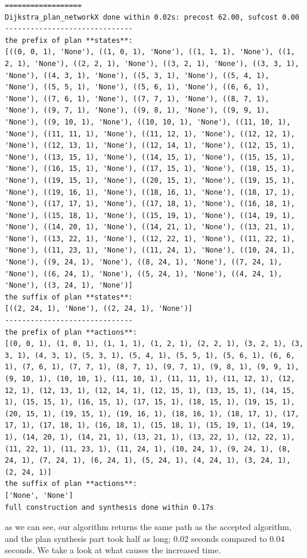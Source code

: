 \begin{lstlisting}
==================
Dijkstra_plan_networkX done within 0.02s: precost 62.00, sufcost 0.00
------------------------------
the prefix of plan **states**:
[((0, 0, 1), 'None'), ((1, 0, 1), 'None'), ((1, 1, 1), 'None'), ((1, 2, 1), 'None'), ((2, 2, 1), 'None'), ((3, 2, 1), 'None'), ((3, 3, 1), 'None'), ((4, 3, 1), 'None'), ((5, 3, 1), 'None'), ((5, 4, 1), 'None'), ((5, 5, 1), 'None'), ((5, 6, 1), 'None'), ((6, 6, 1), 'None'), ((7, 6, 1), 'None'), ((7, 7, 1), 'None'), ((8, 7, 1), 'None'), ((9, 7, 1), 'None'), ((9, 8, 1), 'None'), ((9, 9, 1), 'None'), ((9, 10, 1), 'None'), ((10, 10, 1), 'None'), ((11, 10, 1), 'None'), ((11, 11, 1), 'None'), ((11, 12, 1), 'None'), ((12, 12, 1), 'None'), ((12, 13, 1), 'None'), ((12, 14, 1), 'None'), ((12, 15, 1), 'None'), ((13, 15, 1), 'None'), ((14, 15, 1), 'None'), ((15, 15, 1), 'None'), ((16, 15, 1), 'None'), ((17, 15, 1), 'None'), ((18, 15, 1), 'None'), ((19, 15, 1), 'None'), ((20, 15, 1), 'None'), ((19, 15, 1), 'None'), ((19, 16, 1), 'None'), ((18, 16, 1), 'None'), ((18, 17, 1), 'None'), ((17, 17, 1), 'None'), ((17, 18, 1), 'None'), ((16, 18, 1), 'None'), ((15, 18, 1), 'None'), ((15, 19, 1), 'None'), ((14, 19, 1), 'None'), ((14, 20, 1), 'None'), ((14, 21, 1), 'None'), ((13, 21, 1), 'None'), ((13, 22, 1), 'None'), ((12, 22, 1), 'None'), ((11, 22, 1), 'None'), ((11, 23, 1), 'None'), ((11, 24, 1), 'None'), ((10, 24, 1), 'None'), ((9, 24, 1), 'None'), ((8, 24, 1), 'None'), ((7, 24, 1), 'None'), ((6, 24, 1), 'None'), ((5, 24, 1), 'None'), ((4, 24, 1), 'None'), ((3, 24, 1), 'None')]
the suffix of plan **states**:
[((2, 24, 1), 'None'), ((2, 24, 1), 'None')]
------------------------------
the prefix of plan **actions**:
[(0, 0, 1), (1, 0, 1), (1, 1, 1), (1, 2, 1), (2, 2, 1), (3, 2, 1), (3, 3, 1), (4, 3, 1), (5, 3, 1), (5, 4, 1), (5, 5, 1), (5, 6, 1), (6, 6, 1), (7, 6, 1), (7, 7, 1), (8, 7, 1), (9, 7, 1), (9, 8, 1), (9, 9, 1), (9, 10, 1), (10, 10, 1), (11, 10, 1), (11, 11, 1), (11, 12, 1), (12, 12, 1), (12, 13, 1), (12, 14, 1), (12, 15, 1), (13, 15, 1), (14, 15, 1), (15, 15, 1), (16, 15, 1), (17, 15, 1), (18, 15, 1), (19, 15, 1), (20, 15, 1), (19, 15, 1), (19, 16, 1), (18, 16, 1), (18, 17, 1), (17, 17, 1), (17, 18, 1), (16, 18, 1), (15, 18, 1), (15, 19, 1), (14, 19, 1), (14, 20, 1), (14, 21, 1), (13, 21, 1), (13, 22, 1), (12, 22, 1), (11, 22, 1), (11, 23, 1), (11, 24, 1), (10, 24, 1), (9, 24, 1), (8, 24, 1), (7, 24, 1), (6, 24, 1), (5, 24, 1), (4, 24, 1), (3, 24, 1), (2, 24, 1)]
the suffix of plan **actions**:
['None', 'None']
full construction and synthesis done within 0.17s 
\end{lstlisting}
as we can see, our algorithm returns the same path as the accepted algorithm, and the plan synthesis part took half as long; 0.02 seconds compared to 0.04 seconds. We take a look at what causes the increased time. 

